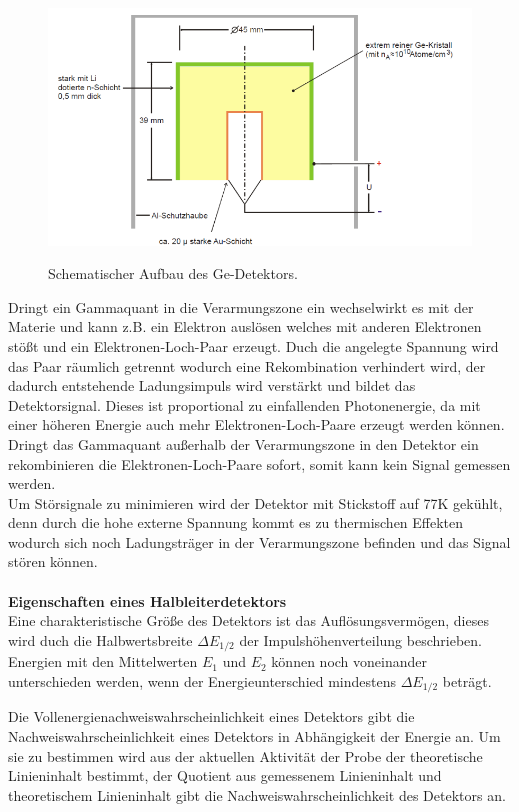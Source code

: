 \begin{figure}
  \centering
  \includegraphics[height=7cm]{Aufbau.png}
  \caption{Schematischer Aufbau des Ge-Detektors. \cite{skript}}
  \label{fig:Aufbau}
\end{figure}

Dringt ein Gammaquant in die Verarmungszone ein wechselwirkt es mit der Materie und kann
z.B. ein Elektron auslösen welches mit anderen Elektronen stößt und ein Elektronen-Loch-Paar erzeugt.
Duch die angelegte Spannung wird das Paar räumlich getrennt wodurch eine Rekombination verhindert wird,
der dadurch entstehende Ladungsimpuls
wird verstärkt und bildet das Detektorsignal. Dieses ist proportional zu einfallenden Photonenergie, da mit
einer höheren Energie auch mehr Elektronen-Loch-Paare erzeugt werden können.
Dringt das Gammaquant außerhalb der Verarmungszone in den Detektor ein rekombinieren die
Elektronen-Loch-Paare sofort, somit kann kein Signal gemessen werden.\\
Um Störsignale zu minimieren wird der Detektor mit Stickstoff auf 77\;K gekühlt, denn durch die
hohe externe Spannung kommt es zu thermischen Effekten wodurch sich noch Ladungsträger in der Verarmungszone
befinden und das Signal stören können.
\\
\\
\textbf{Eigenschaften eines Halbleiterdetektors}\\
Eine charakteristische Größe des Detektors ist das Auflösungsvermögen, dieses wird duch die
Halbwertsbreite $\Delta E_{1/2}$ der Impulshöhenverteilung beschrieben. Energien mit den Mittelwerten
$E_1$ und $E_2$ können noch voneinander unterschieden werden, wenn der Energieunterschied mindestens
$\Delta E_{1/2}$ beträgt.

Die Vollenergienachweiswahrscheinlichkeit eines Detektors gibt die Nachweiswahrscheinlichkeit eines Detektors
in Abhängigkeit der Energie an. Um sie zu bestimmen wird aus der aktuellen Aktivität der Probe der
theoretische Linieninhalt bestimmt, der Quotient aus gemessenem Linieninhalt und theoretischem
Linieninhalt gibt die Nachweiswahrscheinlichkeit des Detektors an.

